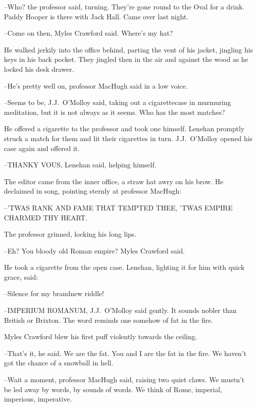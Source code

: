 --Who?
the professor said,
turning.
They're gone round to the Oval for a drink.
Paddy Hooper is there with Jack Hall.
Came over last night.

--Come on then,
Myles Crawford said.
Where's my hat?

He walked jerkily into the office behind,
parting the vent of his jacket,
jingling his keys in his back pocket.
They jingled then in the air and against the wood
as he locked his desk drawer.

--He's pretty well on,
professor MacHugh said in a low voice.

--Seems to be,
J.J.~O'Molloy said,
taking out a cigarettecase in murmuring meditation,
but it is not always as it seems.
Who has the most matches?



He offered a cigarette to the professor and took one himself.
Lenehan promptly struck a match for them and lit their cigarettes in turn.
J.J.~O'Molloy opened his case again and offered it.

--THANKY VOUS,
Lenehan said,
helping himself.

The editor came from the inner office,
a straw hat awry on his brow.
He declaimed in song,
pointing sternly at professor MacHugh:


  --'TWAS RANK AND FAME THAT TEMPTED THEE,
    'TWAS EMPIRE CHARMED THY HEART.


The professor grinned,
locking his long lips.

--Eh?
You bloody old Roman empire?
Myles Crawford said.

He took a cigarette from the open case.
Lenehan,
lighting it for him with quick grace,
said:

--Silence for my brandnew riddle!

--IMPERIUM ROMANUM,
J.J.~O'Molloy said gently.
It sounds nobler than British or Brixton.
The word reminds one somehow of fat in the fire.

Myles Crawford blew his first puff violently towards the ceiling.

--That's it,
he said.
We are the fat.
You and I are the fat in the fire.
We haven't got the chance of a snowball in hell.



--Wait a moment,
professor MacHugh said,
raising two quiet claws.
We mustn't be led away by words,
by sounds of words.
We think of Rome,
imperial, imperious, imperative.

